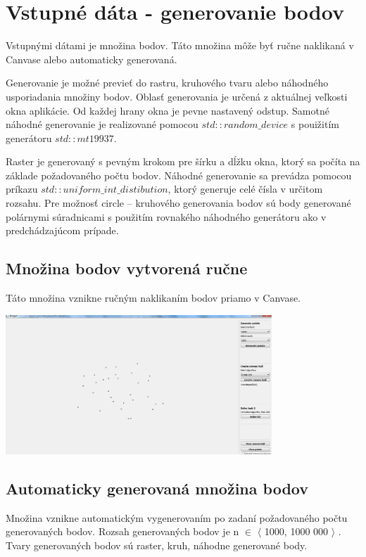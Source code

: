 \documentclass[12pt]{article}
\begin{document}
\section{Vstupné dáta - generovanie bodov}
Vstupnými dátami je množina bodov. Táto množina môže byť ručne naklikaná v Canvase alebo automaticky generovaná.

Generovanie je možné previeť do rastru, kruhového tvaru alebo náhodného usporiadania množiny bodov. Oblasť generovania je určená z aktuálnej veľkosti okna aplikácie. Od každej hrany okna je pevne nastavený odstup. Samotné náhodné generovanie je realizované pomocou $std:: random\_device$ s pouižitím generátoru $std::mt19937$.

Raster je generovaný s pevným krokom pre šírku a dĺžku okna, ktorý sa počíta na základe požadovaného počtu bodov. Náhodné generovanie sa prevádza pomocou príkazu $std::uniform\_int\_distibution$, ktorý generuje celé čísla v určitom rozsahu. Pre možnosť circle -- kruhového generovania bodov sú body generované polárnymi súradnicami s použitím rovnakého náhodného generátoru ako v predchádzajúcom prípade.

\subsection{Množina bodov vytvorená ručne}
Táto množina vznikne ručným naklikaním bodov priamo v Canvase.

\begin{center}
   \includegraphics[width=10cm]{./img/points_manual.png}
\end{center}


\subsection{Automaticky generovaná množina bodov}
Množina vznikne automatickým vygenerovaním po zadaní požadovaného počtu generovaných bodov. Rozsah generovaných bodov je  n $\in$ $\langle$ 1000, 1000 000 $\rangle$ . Tvary generovaných bodov sú raster, kruh, náhodne generované body.
\end{document}
